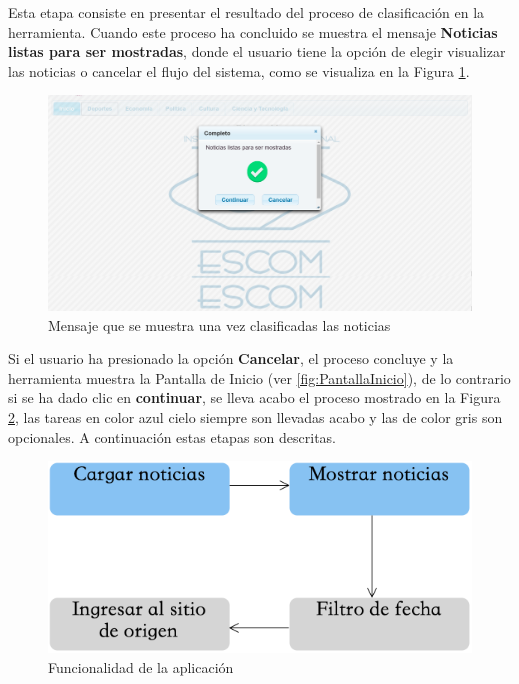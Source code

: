 Esta etapa consiste en presentar el resultado del proceso de clasificación en la herramienta. Cuando este proceso ha concluido se muestra el mensaje \textbf{Noticias listas para ser mostradas}, donde el usuario tiene la opción de elegir visualizar las noticias o cancelar el flujo del sistema, como se visualiza en la Figura \ref{fig:notClass}.

\begin{figure}[H]
\centering
\includegraphics[scale=0.29]{imagenes/Capitulo5/noticiasListasParaSerMostradas.png}
\caption{Mensaje que se muestra una vez clasificadas las noticias}
\label{fig:notClass}
\end{figure}

Si el usuario ha presionado la opción \textbf{Cancelar}, el proceso concluye y la herramienta muestra la Pantalla de Inicio (ver \ref{fig:PantallaInicio}), de lo contrario si se ha dado clic en \textbf{continuar}, se lleva acabo el proceso mostrado en la Figura \ref{fig:cp5:mostrar}, las tareas en color azul cielo siempre son llevadas acabo y las de color gris son opcionales. A continuación estas etapas son descritas.

\begin{figure}[H]
\centering
\includegraphics[scale=0.55]{imagenes/Capitulo5/AplicacionWeb/MostrarDatosApp.png}
\caption{Funcionalidad de la aplicación}
\label{fig:cp5:mostrar}
\end{figure}


